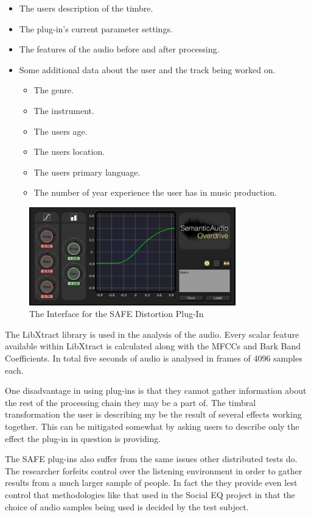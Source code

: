 			\begin{itemize}
				\item The users description of the timbre.
				\item The plug-in's current parameter settings.
				\item The features of the audio before and after processing.
				\item Some additional data about the user and the track being worked on.
				\begin{itemize}
					\item The genre.
					\item The instrument.
					\item The users age.
					\item The users location.
					\item The users primary language.
					\item The number of year experience the user has in music production.
				\end{itemize}
			\end{itemize}

			\begin{figure}[h!]
				\centering
				\includegraphics[width=0.8\textwidth]{chapter5/Images/SAFEDistortion.png}
				\caption{The Interface for the SAFE Distortion Plug-In}
				\label{fig:SAFE-Distortion}
			\end{figure}

			The LibXtract library \citep{bullock2007libxtract} is used in the analysis of the audio. Every
			scalar feature available within LibXtract is calculated along with the MFCCs and Bark Band
			Coefficients. In total five seconds of audio is analysed in frames of 4096 samples each.


			One disadvantage in using plug-ins is that they cannot gather information about the rest of the
			processing chain they may be a part of. The timbral transformation the user is describing my be the
			result of several effects working together. This can be mitigated somewhat by asking users to
			describe only the effect the plug-in in question is providing.

			The SAFE plug-ins also suffer from the same issues other distributed tests do. The researcher
			forfeits control over the listening environment in order to gather results from a much larger sample
			of people. In fact the they provide even lest control that methodologies like that used in the
			Social EQ project \citep{cartwright2013socialeq} in that the choice of audio samples being used is
			decided by the test subject. 
